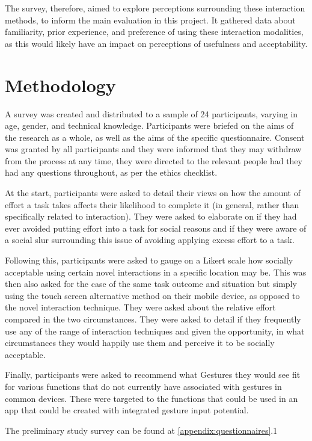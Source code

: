 \documentclass{l4proj}
\begin{document}
The survey, therefore, aimed to explore perceptions surrounding these interaction methods, to inform the main evaluation in this project. It gathered data about familiarity, prior experience, and preference of using these interaction modalities, as this would likely have an impact on perceptions of usefulness and acceptability.

\section{Methodology}

A survey was created and distributed to a sample of 24 participants, varying in age, gender, and technical knowledge. Participants were briefed on the aims of the research as a whole, as well as the aims of the specific questionnaire. Consent was granted by all participants and they were informed that they may withdraw from the process at any time, they were directed to the relevant people had they had any questions throughout, as per the ethics checklist. 

At the start, participants were asked to detail their views on how the amount of effort a task takes affects their likelihood to complete it (in general, rather than specifically related to interaction). They were asked to elaborate on if they had ever avoided putting effort into a task for social reasons and if they were aware of a social slur surrounding this issue of avoiding applying excess effort to a task.

Following this, participants were asked to gauge on a Likert scale how socially acceptable using certain novel interactions in a specific location may be. This was then also asked for the case of the same task outcome and situation but simply using the touch screen alternative method on their mobile device, as opposed to the novel interaction technique. They were asked about the relative effort compared in the two circumstances. They were asked to detail if they frequently use any of the range of interaction techniques and given the opportunity, in what circumstances they would happily use them and perceive it to be socially acceptable.

Finally, participants were asked to recommend what Gestures they would see fit for various functions that do not currently have associated with gestures in common devices. These were targeted to the functions that could be used in an app that could be created with integrated gesture input potential.

The preliminary study survey can be found at \autoref{appendix:questionnaires}.1
\end{document}

